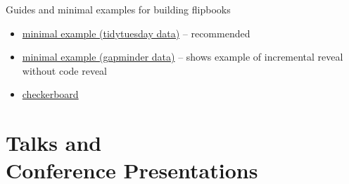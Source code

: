 \documentclass[margin, 10pt]{CVStyleTemplate}\usepackage[]{graphicx}\usepackage[]{color}
\begin{document}
\begin{resume}
Guides and minimal examples for building flipbooks

\begin{itemize}

\item \href{https://evamaerey.github.io/little_flipbooks_library/tidytuesday_minimal_example/tidytuesday_minimal_example}{minimal example (tidytuesday data)} -- recommended
\item \href{https://evamaerey.github.io/little_flipbooks_library/minimal_example/minimal_example}{minimal example (gapminder data)} -- shows example of incremental reveal without code reveal
\item \href{https://evamaerey.github.io/little_flipbooks_library/checkerboard/checkerboard.html}{checkerboard}

\end{itemize}

% 

% 
% 
% 


\section{Talks and \\ Conference Presentations}




\end{resume}
\end{document}
